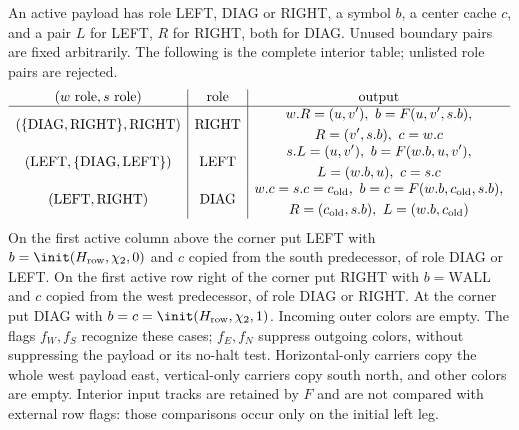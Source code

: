 An active payload has role LEFT, DIAG or RIGHT, a symbol $b$, a center cache $c$, and a pair $L$ for LEFT, $R$ for RIGHT, both for DIAG. Unused boundary pairs are fixed arbitrarily. The following is the complete interior table; unlisted role pairs are rejected.
\[
\begin{array}{c|c|c}
 (w\text{ role},s\text{ role})&\text{role}&\text{output}\\\hline
 (\{\mathrm{DIAG},\mathrm{RIGHT}\},\mathrm{RIGHT})&\mathrm{RIGHT}&
 \begin{gathered}w.R=(u,v'),\ b=F(u,v',s.b),\\R=(v',s.b),\ c=w.c\end{gathered}\\[5pt]
 (\mathrm{LEFT},\{\mathrm{DIAG},\mathrm{LEFT}\})&\mathrm{LEFT}&
 \begin{gathered}s.L=(u,v'),\ b=F(w.b,u,v'),\\L=(w.b,u),\ c=s.c\end{gathered}\\[5pt]
 (\mathrm{LEFT},\mathrm{RIGHT})&\mathrm{DIAG}&
 \begin{gathered}w.c=s.c=c_{\rm old},\ b=c=F(w.b,c_{\rm old},s.b),\\
 R=(c_{\rm old},s.b),\ L=(w.b,c_{\rm old})\end{gathered}
\end{array}
\]
On the first active column above the corner put LEFT with $b=\init(H_{\rm row},\chi_2,0)$ and $c$ copied from the south predecessor, of role DIAG or LEFT. On the first active row right of the corner put RIGHT with $b=\mathrm{WALL}$ and $c$ copied from the west predecessor, of role DIAG or RIGHT. At the corner put DIAG with $b=c=\init(H_{\rm row},\chi_2,1)$. Incoming outer colors are empty. The flags $f_W,f_S$ recognize these cases; $f_E,f_N$ suppress outgoing colors, without suppressing the payload or its no-halt test. Horizontal-only carriers copy the whole west payload east, vertical-only carriers copy south north, and other colors are empty. Interior input tracks are retained by $F$ and are not compared with external row flags: those comparisons occur only on the initial left leg.

